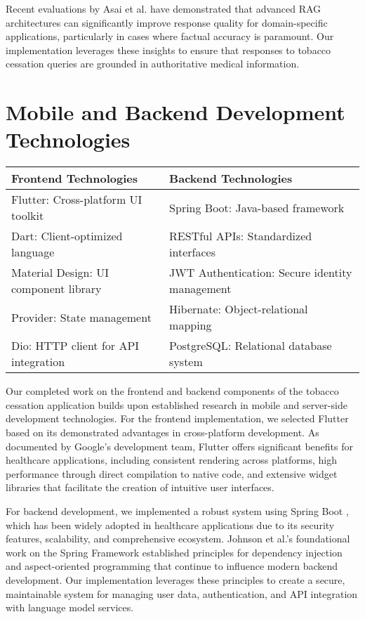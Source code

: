 Recent evaluations by Asai et al. \cite{RAGEvaluation} have demonstrated that advanced RAG architectures can significantly improve response quality for domain-specific applications, particularly in cases where factual accuracy is paramount. Our implementation leverages these insights to ensure that responses to tobacco cessation queries are grounded in authoritative medical information.

\section{Mobile and Backend Development Technologies}
\begin{center}
\begin{tabular}{|>{}p{}|>{}p{}|}
\hline
\rowcolor{gray!15} \textbf{Frontend Technologies} & \textbf{Backend Technologies} \\
\hline
Flutter: Cross-platform UI toolkit & Spring Boot: Java-based framework \\
\hline
Dart: Client-optimized language & RESTful APIs: Standardized interfaces \\
\hline
Material Design: UI component library & JWT Authentication: Secure identity management \\
\hline
Provider: State management & Hibernate: Object-relational mapping \\
\hline
Dio: HTTP client for API integration & PostgreSQL: Relational database system \\
\hline
\end{tabular}
\end{center}

Our completed work on the frontend and backend components of the tobacco cessation application builds upon established research in mobile and server-side development technologies. For the frontend implementation, we selected Flutter \cite{Flutter} based on its demonstrated advantages in cross-platform development. As documented by Google's development team, Flutter offers significant benefits for healthcare applications, including consistent rendering across platforms, high performance through direct compilation to native code, and extensive widget libraries that facilitate the creation of intuitive user interfaces.

For backend development, we implemented a robust system using Spring Boot \cite{Spring}, which has been widely adopted in healthcare applications due to its security features, scalability, and comprehensive ecosystem. Johnson et al.'s foundational work on the Spring Framework established principles for dependency injection and aspect-oriented programming that continue to influence modern backend development. Our implementation leverages these principles to create a secure, maintainable system for managing user data, authentication, and API integration with language model services.

